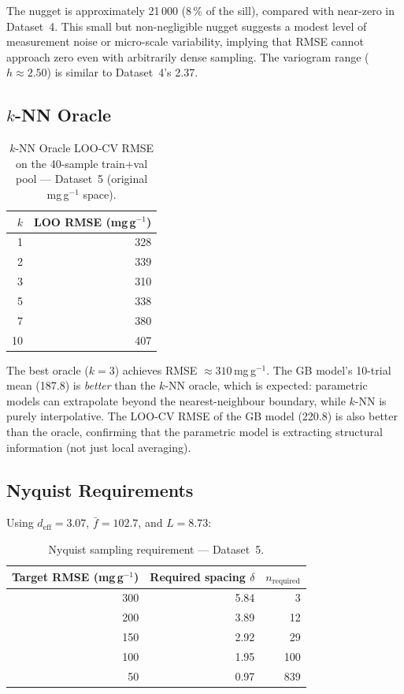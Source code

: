 \documentclass[12pt,a4paper]{article}
\begin{document}
The nugget is approximately 21\,000 (8\,\% of the sill), compared with
near-zero in Dataset~4.  This small but non-negligible nugget suggests
a modest level of measurement noise or micro-scale variability, implying
that RMSE cannot approach zero even with arbitrarily dense sampling.
The variogram range ($h \approx 2.50$) is similar to Dataset~4's 2.37.

\subsection{$k$-NN Oracle}

\begin{table}[h]
\centering
\caption{$k$-NN Oracle LOO-CV RMSE on the 40-sample train+val pool —
  Dataset~5 (original mg\,g$^{-1}$ space).}
\label{tab:ds5_knn_oracle}
\begin{tabular}{rr}
\toprule
$k$ & LOO RMSE (mg\,g$^{-1}$) \\
\midrule
1  & 328 \\
2  & 339 \\
3  & 310 \\
5  & 338 \\
7  & 380 \\
10 & 407 \\
\bottomrule
\end{tabular}
\end{table}

The best oracle ($k=3$) achieves RMSE $\approx 310$\,mg\,g$^{-1}$.
The GB model's 10-trial mean (187.8) is \emph{better} than the $k$-NN
oracle, which is expected: parametric models can extrapolate beyond the
nearest-neighbour boundary, while $k$-NN is purely interpolative.  The
LOO-CV RMSE of the GB model (220.8) is also better than the oracle,
confirming that the parametric model is extracting structural information
(not just local averaging).

\subsection{Nyquist Requirements}

Using $d_\text{eff} = 3.07$, $\bar{f} = 102.7$, and $L = 8.73$:

\begin{table}[h]
\centering
\caption{Nyquist sampling requirement — Dataset~5.}
\label{tab:ds5_nyquist_req}
\begin{tabular}{rrr}
\toprule
Target RMSE (mg\,g$^{-1}$) & Required spacing $\delta$ & $n_\text{required}$ \\
\midrule
300 & 5.84 &   3 \\
200 & 3.89 &  12 \\
150 & 2.92 &  29 \\
100 & 1.95 & 100 \\
 50 & 0.97 & 839 \\
\bottomrule
\end{tabular}
\end{table}
\end{document}
